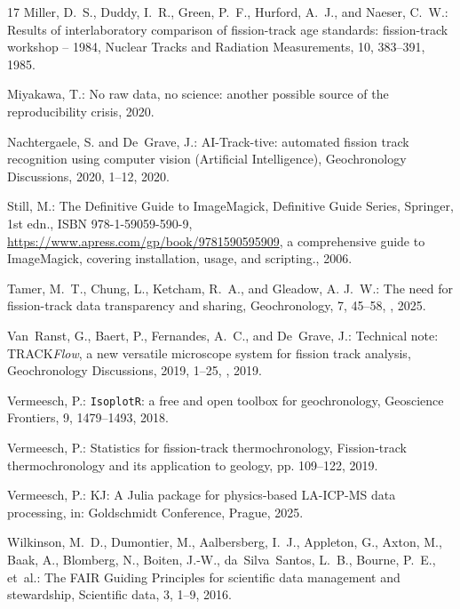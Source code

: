 \documentclass[gchron, manuscript]{copernicus}
\begin{document}
\begin{thebibliography}{17}
Miller, D.~S., Duddy, I.~R., Green, P.~F., Hurford, A.~J., and Naeser, C.~W.:
  Results of interlaboratory comparison of fission-track age standards:
  fission-track workshop -- 1984, Nuclear Tracks and Radiation Measurements,
  10, 383--391, 1985.

Miyakawa, T.: No raw data, no science: another possible source of the
  reproducibility crisis, 2020.

Nachtergaele, S. and De~Grave, J.: {AI-Track-tive: automated fission track
  recognition using computer vision (Artificial Intelligence)}, Geochronology
  Discussions, 2020, 1--12, 2020.

Still, M.: The Definitive Guide to ImageMagick, Definitive Guide Series,
  Springer, 1st edn., ISBN 978-1-59059-590-9,
  \urlprefix\url{https://www.apress.com/gp/book/9781590595909}, a comprehensive
  guide to ImageMagick, covering installation, usage, and scripting., 2006.

Tamer, M.~T., Chung, L., Ketcham, R.~A., and Gleadow, A. J.~W.: The need for
  fission-track data transparency and sharing, Geochronology, 7, 45--58,
  , 2025.

Van~Ranst, G., Baert, P., Fernandes, A.~C., and De~Grave, J.: Technical note:
  TRACK\textit{Flow}, a new versatile microscope system for fission track
  analysis, Geochronology Discussions, 2019, 1--25,
  , 2019.

Vermeesch, P.: {\texttt{IsoplotR}: a free and open toolbox for geochronology},
  Geoscience Frontiers, 9, 1479--1493, 2018.

Vermeesch, P.: Statistics for fission-track thermochronology, Fission-track
  thermochronology and its application to geology, pp. 109--122, 2019.

Vermeesch, P.: {KJ: A Julia package for physics-based LA-ICP-MS data
  processing}, in: Goldschmidt Conference, Prague, 2025.

Wilkinson, M.~D., Dumontier, M., Aalbersberg, I.~J., Appleton, G., Axton, M.,
  Baak, A., Blomberg, N., Boiten, J.-W., da~Silva~Santos, L.~B., Bourne, P.~E.,
  et~al.: {The FAIR Guiding Principles for scientific data management and
  stewardship}, Scientific data, 3, 1--9, 2016.

\end{thebibliography}

%
%
\end{document}
